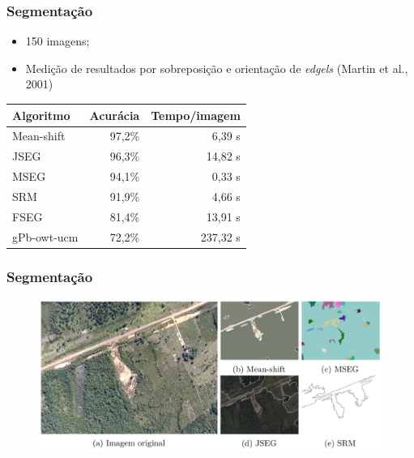 \documentclass[t]{beamer}
\begin{document}
\begin{frame}
	\frametitle{Segmentação}

	\begin{itemize}
		\item 150 imagens;
		\item Medição de resultados por sobreposição e orientação de \textit{edgels} (Martin et al., 2001)
	\end{itemize}

	\small{
	\begin{table}
	\centering
	\begin{tabulary}{\linewidth}{|L|R|R|}
		\hline
		\textbf{Algoritmo} & \textbf{Acurácia} & \textbf{Tempo/imagem} \\ \hline
		Mean-shift  & 97,2\% & 6,39 s \\ \hline
		JSEG        & 96,3\% & 14,82 s \\ \hline
		MSEG        & 94,1\% & 0,33 s \\ \hline
		SRM         & 91,9\% & 4,66 s \\ \hline
		FSEG        & 81,4\% & 13,91 s \\ \hline
		gPb-owt-ucm & 72,2\% & 237,32 s \\ \hline
	\end{tabulary}
	\end{table}
	}

\end{frame}

\begin{frame}[c]
	\frametitle{Segmentação}

	\begin{figure}[c]
  		\centering
		\includegraphics[width=\textwidth]{imgs/gambi_apresentacao}
	\end{figure}

\end{frame}
\end{document}
